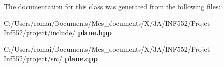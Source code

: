 The documentation for this class was generated from the following files\+:\begin{DoxyCompactItemize}
\item 
C\+:/\+Users/romai/\+Documents/\+Mes\+\_\+documents/\+X/3\+A/\+I\+N\+F552/\+Projet-\/\+Inf552/project/include/\textbf{ plane.\+hpp}\item 
C\+:/\+Users/romai/\+Documents/\+Mes\+\_\+documents/\+X/3\+A/\+I\+N\+F552/\+Projet-\/\+Inf552/project/src/\textbf{ plane.\+cpp}\end{DoxyCompactItemize}
